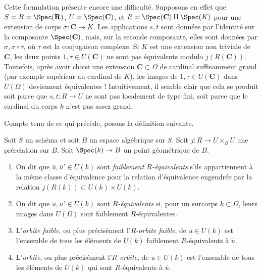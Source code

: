 \medskip\noindent
Cette formulation présente encore une difficulté. Supposons en effet que
$S = B = \Spec(\mathbf{R})$,
$U = \Spec(\mathbf{C})$, et
$R = \Spec(\mathbf{C}) \amalg \Spec(K)$
pour une extension de corps $\sigma : \mathbf{C} \to K$.
Les applications $s, t$ sont données par l'identité sur la composante $\Spec(\mathbf{C})$,
mais, sur la seconde composante, elles sont données par $\sigma, \sigma \circ \tau$, où
$\tau$ est la conjugaison complexe. Si
$K$ est une extension non triviale de $\mathbf{C}$, les deux points
$1, \tau \in U(\mathbf{C})$ ne sont pas équivalents modulo
$j(R(\mathbf{C}))$. Toutefois, après avoir choisi une extension $\mathbf{C} \subset \Omega$
de cardinal suffisamment grand (par exemple supérieur au cardinal
de $K$), les images de $1, \tau \in U(\mathbf{C})$ dans
$U(\Omega)$ deviennent équivalentes ! Intuitivement, il semble clair que
cela se produit soit parce que $s, t : R \to U$ ne sont pas localement de type fini,
soit parce que le cardinal du corps $k$ n'est pas assez grand.

\medskip\noindent
Compte tenu de ce qui précède, posons la définition suivante.

\begin{definition}
\label{definition-geometric-orbits}
Soit $S$ un schéma et soit $B$ un espace algébrique sur $S$.
Soit $j : R \to U \times_B U$ une prérelation sur $B$.
Soit $\Spec(k) \to B$ un point géométrique de $B$.
\begin{enumerate}
\item On dit que $\overline{u}, \overline{u}' \in U(k)$ sont
{\it faiblement $R$-équivalents} s'ils appartiennent à la même classe d'équivalence
pour la relation d'équivalence engendrée par la relation
$j(R(k)) \subset U(k) \times U(k)$.
\item On dit que $\overline{u}, \overline{u}' \in U(k)$ sont
{\it $R$-équivalents} si, pour un surcorps $k \subset \Omega$,
leurs images dans $U(\Omega)$ sont faiblement $R$-équivalentes.
\item L'{\it orbite faible}, ou plus précisément l'{\it $R$-orbite faible},
de $\overline{u} \in U(k)$ est l'ensemble de tous les
éléments de $U(k)$ faiblement $R$-équivalents à $\overline{u}$.
\item L'{\it orbite}, ou plus précisément l'{\it $R$-orbite},
de $\overline{u} \in U(k)$ est l'ensemble de tous les
éléments de $U(k)$ qui sont $R$-équivalents à $\overline{u}$.
\end{enumerate}
\end{definition}


